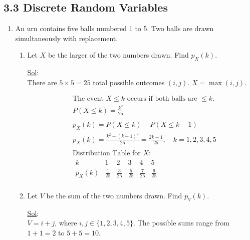 \subsection*{3.3 Discrete Random Variables}
\begin{enumerate}
  \item[2.] An urn contains five balls numbered 1 to 5. Two balls are
    drawn simultaneously with replacement.
    \begin{enumerate}
      \item Let \(X\) be the larger of the two numbers drawn. Find \(p_X (k)\).

        \underline{Sol}:\\

        There are $5 \times 5 = 25$ total possible outcomes $(i, j)$.
        $X = \max(i, j)$.

        $$
        \begin{aligned}
          & \text{The event } X \le k \text{ occurs if both balls are
          } \le k. \\
          & P(X \le k) = \frac{k^2}{25} \\
          \\
          & p_X(k) = P(X \le k) - P(X \le k-1) \\
          & p_X(k) = \frac{k^2 - (k-1)^2}{25} = \frac{2k - 1}{25},
          \quad k = 1, 2, 3, 4, 5 \\
          \\
          & \text{Distribution Table for } X: \\
          &
          \begin{array}{c|ccccc}
            k & 1 & 2 & 3 & 4 & 5 \\
            \hline
            p_X(k) & \frac{1}{25} & \frac{3}{25} & \frac{5}{25} &
            \frac{7}{25} & \frac{9}{25} \\
          \end{array}
        \end{aligned}$$
      \item Let \(V\) be the sum of the two numbers drawn. Find \(p_V (k)\).

        \underline{Sol}:\\
        $V = i + j$, where $i, j \in \{1, 2, 3, 4, 5\}$. The possible
        sums range from $1+1=2$ to $5+5=10$.


\end{enumerate}
\end{enumerate}
